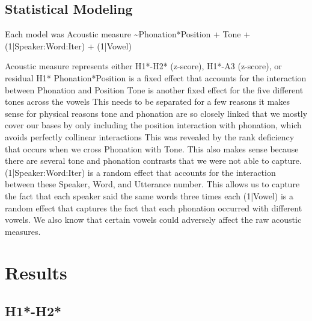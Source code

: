 \documentclass[12pt, letterpaper]{article}
\begin{document}
\subsection{Statistical Modeling} \label{sec:Statistics}

Each model was Acoustic measure \sim  Phonation*Position + Tone + (1|Speaker:Word:Iter) + (1|Vowel)

Acoustic measure represents either H1*-H2* (z-score), H1*-A3 (z-score), or residual H1* 
Phonation*Position is a fixed effect that accounts for the interaction between Phonation and Position
Tone is another fixed effect for the five different tones across the vowels
This needs to be separated for a few reasons
it makes sense for physical reasons
tone and phonation are so closely linked that we mostly cover our bases by only including the position interaction with phonation, which avoids perfectly collinear interactions
This was revealed by the rank deficiency that occurs when we cross Phonation with Tone. 
This also makes sense because there are several tone and phonation contrasts that we were not able to capture.
(1|Speaker:Word:Iter) is a random effect that accounts for the interaction between these Speaker, Word, and Utterance number.
This allows us to capture the fact that each speaker said the same words three times each 
(1|Vowel) is a random effect that captures the fact that each phonation occurred with different vowels. 
We also know that certain vowels could adversely affect the raw acoustic measures.

\section{Results} \label{sec:Results}

\subsection{H1*-H2*} \label{sec:H1H2}
\end{document}
